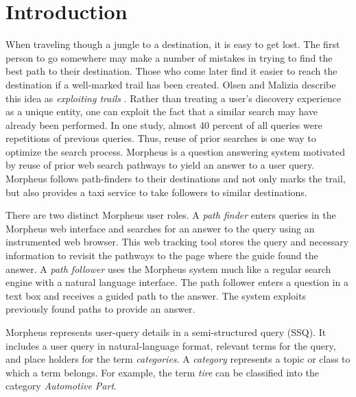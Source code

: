 \section{Introduction}



When traveling though a jungle to a destination, it is easy to get
lost.  The first person to go somewhere may make a number of mistakes
in trying to find the best path to their destination. Those
who come later find it easier to reach the destination if a
well-marked trail has been created. Olsen and Malizia describe this
idea as \emph{exploiting trails} \cite{5379671}.  Rather than treating
a user's discovery experience as a unique entity, one can exploit the fact that a similar search may have already been
performed.  In one study, almost 40 percent of all queries
were repetitions of previous queries\cite{1277770}. Thus, reuse of prior searches is one way to optimize the search
process.  Morpheus is a question answering system motivated by reuse of prior
web search pathways to yield an answer to a user query. Morpheus follows path-finders to their destinations and not only marks the
trail, but also provides a taxi service to take followers to similar
destinations.

There are two distinct Morpheus user roles. A
\textit{path finder} enters queries in the Morpheus web interface and
searches for an answer to the query using an instrumented web browser. 
This web tracking tool stores the query
and necessary information to revisit the pathways to the page where the guide 
found the answer. A \textit{path follower} uses the Morpheus system much like a regular search engine with a natural language interface. The path follower enters a question in a text box and receives a guided path to the answer. The system exploits previously found paths to provide an answer.

Morpheus represents user-query details in a semi-structured query (SSQ). It includes a user query in natural-language format, relevant terms for the query, and place holders for the term \textit{categories}. A \textit{category} represents a
topic or class to which a term belongs. For example, the term \textit{tire} can be classified into the category \textit{Automotive Part}.

